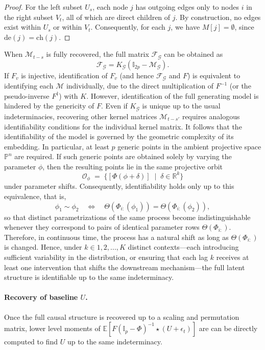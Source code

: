 \documentclass[10pt]{article}
\numberwithin{figure}{section}
\begin{document}
\begin{proof}
    For the left subset $U_s$, each node $j$ has outgoing edges only to nodes $i$ in the right subset $V_t$, all of which are direct children of $j$. By construction, no edges exist within $U_s$ or within $V_t$. Consequently, for each $j$, we have $M[j] = \emptyset$, since $\mathrm{de}(j) = \mathrm{ch}(j)$.
\end{proof}
\medskip

When $\mathcal{M}_{t-s}$ is fully recovered, the full matrix $\mathcal{F}_{\mathscr{G}}$ can be obtained as
\[
    \mathcal{F}_{\mathscr{G}} = K_{\mathscr{G}}(\mathbb{I}_{2p} - \mathcal{M}_{\mathscr{G}}).
\]
If $F_v$ is injective, identification of $F_v$ (and hence $\mathcal{F}_{\mathscr{G}}$ and $F$) is equivalent to identifying each $\mathcal{M}$ individually, due to the direct multiplication of $F^{-1}$ (or the pseudo-inverse $F^{\dagger}$) with $K$. However, identification of the full generating model is hindered by the genericity of $F$. Even if $K_{\mathscr{G}}$ is unique up to the usual indeterminacies, recovering other kernel matrices $\mathcal{M}_{t-s'}$ requires analogous identifiability conditions for the individual kernel matrix. It follows that the identifiability of the model is governed by the geometric complexity of its embedding. In particular, at least $p$ generic points in the ambient projective space $\mathbb{P}^n$ are required. If such generic points are obtained solely by varying the parameter $\phi$, then the resulting points lie in the same projective orbit
\[
   \mathcal{O}_\phi \;=\; \{ [\Phi(\phi + \delta)] \;\mid\; \delta \in \mathbb{R}^k \}
\]
under parameter shifts. Consequently, identifiability holds only up to this
equivalence, that is,
\[
   \phi_1 \sim \phi_2
   \quad \Longleftrightarrow \quad
   \Theta(\Phi_{i:}(\phi_1)) = \Theta(\Phi_{i:}(\phi_2)),
\]
so that distinct parametrizations of the same process become indistinguishable whenever they correspond to pairs of identical parameter rows $\Theta(\Phi_{i:})$. Therefore, in continuous time, the process has a natural shift as long as $\Theta(\Phi_{i:})$ is changed.  Hence, under $k\in {1,2,..., K}$ distinct contexts—each introducing sufficient variability in the distribution, or ensuring that each lag \( k \) receives at least one intervention that shifts the downstream mechanism—the full latent structure is identifiable up to the same indeterminacy. 

\medskip
\paragraph{\textbf{Recovery of baseline $U$}.} Once the full causal structure is recovered up to a scaling and permutation matrix, lower level moments of $\mathbb{E}[F(\mathbb{I}_p-\Phi)^{-1}\star (U+\epsilon_t)]$ are can be directly computed to find $U$ up to the same indeterminacy.
\end{document}
